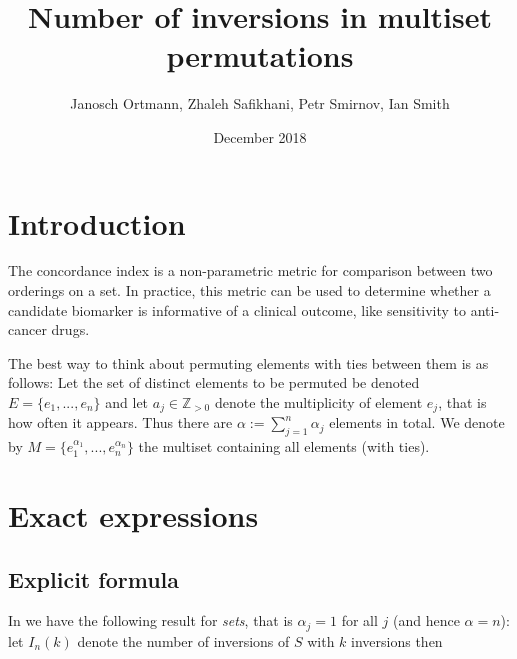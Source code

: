 \documentclass{article}
\title{Number of inversions in multiset permutations}
\author{Janosch Ortmann, Zhaleh Safikhani, Petr Smirnov, Ian Smith}
\date{December 2018}
\newcommand{\zz}{\mathbb{Z}}
\begin{document}
\maketitle

\section{Introduction}
% 

The concordance index is a non-parametric metric for comparison between two orderings on a set.  In practice, this metric can be used to determine whether a candidate biomarker is informative of a clinical outcome, like sensitivity to anti-cancer drugs.  

The best way to think about permuting elements with ties between them is as follows: Let the set of distinct elements to be permuted be denoted $E=\{e_1,...,e_n\}$ and let $a_j\in \zz_{>0}$ denote the multiplicity of element $e_j$, that is how often it appears. Thus there are $\alpha:=\sum_{j=1}^n \alpha_j$ elements in total. We denote by $M=\{e_{1}^{\alpha_{1}},...,e_{n}^{\alpha_n}\}$ the multiset containing all elements (with ties).

\section{Exact expressions}

\subsection{Explicit formula}

In \cite{Margolius} we have the following result for \emph{sets}, that is $\alpha_j=1$ for all $j$ (and hence $\alpha=n$): let $I_n(k)$ denote the number of inversions of $S$ with $k$ inversions then
\end{document}

